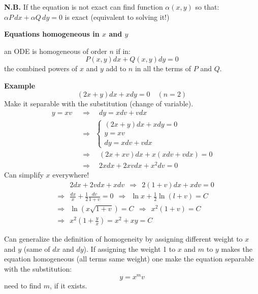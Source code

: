 \documentclass{article}
\begin{document}
\noindent
\textbf{N.B.} If the equation is not exact can find function $\alpha(x, y)$ so that: $\alpha P\,dx + \alpha Q\,dy = 0$ is exact (equivalent to solving it!)

\vspace{2mm}\noindent
\textbf{Equations homogeneous in $x$ and $y$}

\noindent
an ODE is homogeneous of order $n$ if in:
\begin{equation}
    P(x, y) dx + Q(x, y) dy = 0
\end{equation}
the combined powers of $x$ and $y$ add to $n$ in all the terms of $P$ and $Q$.

\noindent
\textbf{Example}
\begin{equation}
    (2x+ y)dx + xdy = 0 \quad (n=2)
\end{equation}
Make it separable with the substitution (change of variable).
\begin{align*}
    y = xv \ \  &\Rightarrow \quad dy = xdv + vdx\\
    &\Rightarrow \ \ \begin{cases}
        (2x+y) dx + xdy = 0 \\ y = xv \\ dy = xdv + vdx
    \end{cases}\\
    &\Rightarrow \quad (2x+xv)dx  + x(xdv + vdx) = 0\\
    &\Rightarrow \quad 2xdx + 2xvdx + x^2dv = 0
\end{align*}
Can simplify $x$ everywhere!
\begin{align*}
    & \quad \quad 2dx + 2vdx + xdv \ \ \Rightarrow \ \ 2(1+v)dx + xdv = 0 \\
    &\Rightarrow \ \  \frac{dx}{x} + \frac12 \frac{dv}{1+v} = 0 \ \ \Rightarrow \ \ \ln{x} + \frac12 \ln{(l+v)} = C \\
    &\Rightarrow \ \ \ln \left( x \sqrt{1 + v} \right) = C \ \ \Rightarrow \ \ x^2 (1 + v) = C \\
    &\Rightarrow \ \ x^2 \left(1 + \frac{y}{x} \right) = x^2 + xy = C
\end{align*}

\newpage

\noindent
Can generalize the definition of homogeneity by assigning different weight to $x$ and $y$ (same of $dx$ and $dy$). If assigning the weight 1 to $x$ and $m$ to $y$ makes the equation homogeneous (all terms same weight) one make the equation separable with the substitution:
\begin{equation}
    y = x^m v
\end{equation}
need to find $m$, if it exists.
\end{document}

